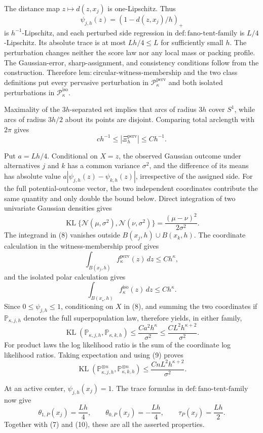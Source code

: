 The distance map \(z\mapsto d(z,x_j)\) is one-Lipschitz.  Thus
\[
 \psi_{j,h}(z)=(1-d(z,x_j)/h)_+
\]
is \(h^{-1}\)-Lipschitz, and each perturbed side regression in \(\mathrm{def:fano\text{-}tent\text{-}family}\) is \(L/4\)-Lipschitz.  Its absolute trace is at most \(Lh/4\le L\) for sufficiently small \(h\).  The perturbation changes neither the score law nor any local mass or packing profile.  The Gaussian-error, sharp-assignment, and consistency conditions follow from the construction.  Therefore \(\mathrm{lem:circular\text{-}witness\text{-}membership}\) and the two class definitions put every pervasive perturbation in \(\mathcal P_{\kappa}^{\mathrm{perv}}\) and both isolated perturbations in \(\mathcal P_{\kappa}^{\mathrm{iso}}\).

Maximality of the \(3h\)-separated set implies that arcs of radius \(3h\) cover \(S^1\), while arcs of radius \(3h/2\) about its points are disjoint.  Comparing total arclength with \(2\pi\) gives
\[
 c h^{-1}\le |\Xi_h^{\mathrm{perv}}|\le C h^{-1}. \tag{7}
\]

Put \(a=Lh/4\).  Conditional on \(X=z\), the observed Gaussian outcome under alternatives \(j\) and \(k\) has a common variance \(\sigma^2\), and the difference of its means has absolute value \(a|\psi_{j,h}(z)-\psi_{k,h}(z)|\), irrespective of the assigned side.  For the full potential-outcome vector, the two independent coordinates contribute the same quantity and only double the bound below.  Direct integration of two univariate Gaussian densities gives
\[
 \operatorname{KL}\{\mathcal N(\mu,\sigma^2),\mathcal N(\nu,\sigma^2)\}
 =\frac{(\mu-\nu)^2}{2\sigma^2}. \tag{8}
\]
The integrand in (8) vanishes outside \(B(x_j,h)\cup B(x_k,h)\).  The coordinate calculation in the witness-membership proof gives
\[
 \int_{B(x_j,h)}f_{\kappa}^{\mathrm{perv}}(z)\,dz\le Ch^{\kappa},
\]
and the isolated polar calculation gives
\[
 \int_{B(x_{\star},h)}f_{\kappa}^{\mathrm{iso}}(z)\,dz\le Ch^{\kappa}.
\]
Since \(0\le\psi_{j,h}\le1\), conditioning on \(X\) in (8), and summing the two coordinates if \(\mathbb P_{\kappa,j,h}\) denotes the full superpopulation law, therefore yields, in either family,
\[
 \operatorname{KL}(\mathbb P_{\kappa,j,h},\mathbb P_{\kappa,k,h})
 \le \frac{Ca^2h^{\kappa}}{\sigma^2}
 \le \frac{CL^2h^{\kappa+2}}{\sigma^2}. \tag{9}
\]
For product laws the log likelihood ratio is the sum of the coordinate log likelihood ratios.  Taking expectation and using (9) proves
\[
 \operatorname{KL}(\mathbb P_{\kappa,j,h}^{\otimes n},
 \mathbb P_{\kappa,k,h}^{\otimes n})
 \le \frac{CnL^2h^{\kappa+2}}{\sigma^2}. \tag{10}
\]

At an active center, \(\psi_{j,h}(x_j)=1\).  The trace formulas in \(\mathrm{def:fano\text{-}tent\text{-}family}\) now give
\[
 \theta_{1,P}(x_j)=\frac{Lh}{4},\qquad
 \theta_{0,P}(x_j)=-\frac{Lh}{4},\qquad
 \tau_P(x_j)=\frac{Lh}{2}.
\]
Together with (7) and (10), these are all the asserted properties.